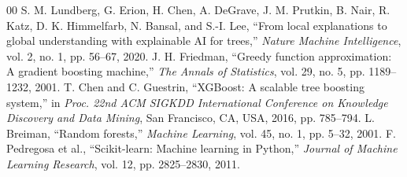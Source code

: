 \documentclass[conference]{IEEEtran}
\begin{document}
\begin{thebibliography}{00}
 S. M. Lundberg, G. Erion, H. Chen, A. DeGrave, J. M. Prutkin, B. Nair, R. Katz, D. K. Himmelfarb, N. Bansal, and S.-I. Lee, ``From local explanations to global understanding with explainable AI for trees,'' \textit{Nature Machine Intelligence}, vol. 2, no. 1, pp. 56--67, 2020.
 J. H. Friedman, ``Greedy function approximation: A gradient boosting machine,'' \textit{The Annals of Statistics}, vol. 29, no. 5, pp. 1189--1232, 2001.
 T. Chen and C. Guestrin, ``XGBoost: A scalable tree boosting system,'' in \textit{Proc. 22nd ACM SIGKDD International Conference on Knowledge Discovery and Data Mining}, San Francisco, CA, USA, 2016, pp. 785--794.
 L. Breiman, ``Random forests,'' \textit{Machine Learning}, vol. 45, no. 1, pp. 5--32, 2001.
 F. Pedregosa et al., ``Scikit-learn: Machine learning in Python,'' \textit{Journal of Machine Learning Research}, vol. 12, pp. 2825--2830, 2011.
\end{thebibliography}
\end{document}
